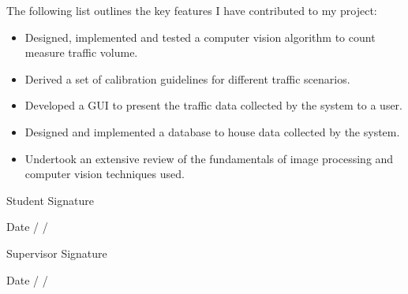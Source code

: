 \begin{contributions}
The following list outlines the key features I have contributed to my project:

\begin{itemize}
    \item Designed, implemented and tested a computer vision algorithm to count measure traffic volume.
    \item Derived a set of calibration guidelines for different traffic scenarios.
    \item Developed a GUI to present the traffic data collected by the system to a user.
    \item Designed and implemented a database to house data collected by the system.
    \item Undertook an extensive review of the fundamentals of image processing and computer vision techniques used.  
\end{itemize}

  \vskip 0.5in 
  \normalsize {Student Signature \underline{\hspace{1.5in}}}
  
  \vskip 0.1in
  \normalsize {Date \underline{\hspace{0.5in}} / \underline{\hspace{0.5in}} / \underline{\hspace{0.5in}}}

  \vskip 0.5in 
  \normalsize {Supervisor Signature \underline{\hspace{1.5in}}}
  
  \vskip 0.1in
  \normalsize {Date \underline{\hspace{0.5in}} / \underline{\hspace{0.5in}} / \underline{\hspace{0.5in}}}
  

\end{contributions}